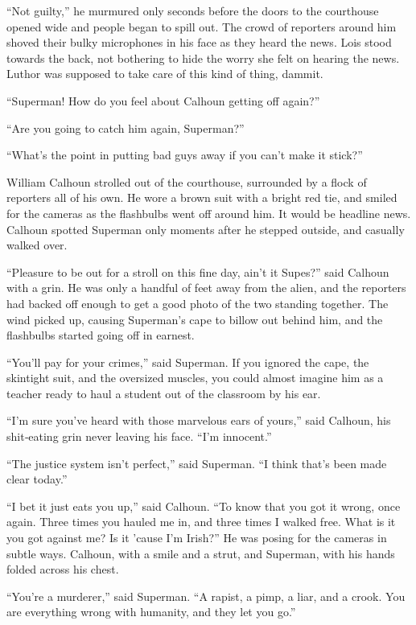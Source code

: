 \documentclass[ebook,12pt]{memoir}
\begin{document}
``Not guilty,'' he murmured only seconds before the doors to the
courthouse opened wide and people began to spill out. The crowd of
reporters around him shoved their bulky microphones in his face as they
heard the news. Lois stood towards the back, not bothering to hide the
worry she felt on hearing the news. Luthor was supposed to take care of
this kind of thing, dammit.

``Superman! How do you feel about Calhoun getting off again?''

``Are you going to catch him again, Superman?''

``What's the point in putting bad guys away if you can't make it
stick?''

William Calhoun strolled out of the courthouse, surrounded by a flock of
reporters all of his own. He wore a brown suit with a bright red tie,
and smiled for the cameras as the flashbulbs went off around him. It
would be headline news. Calhoun spotted Superman only moments after he
stepped outside, and casually walked over.

``Pleasure to be out for a stroll on this fine day, ain't it Supes?''
said Calhoun with a grin. He was only a handful of feet away from the
alien, and the reporters had backed off enough to get a good photo of
the two standing together. The wind picked up, causing Superman's cape
to billow out behind him, and the flashbulbs started going off in
earnest.

``You'll pay for your crimes,'' said Superman. If you ignored the cape,
the skintight suit, and the oversized muscles, you could almost imagine
him as a teacher ready to haul a student out of the classroom by his
ear.

``I'm sure you've heard with those marvelous ears of yours,'' said
Calhoun, his shit‐eating grin never leaving his face. ``I'm innocent.''

``The justice system isn't perfect,'' said Superman. ``I think that's
been made clear today.''

``I bet it just eats you up,'' said Calhoun. ``To know that you got it
wrong, once again. Three times you hauled me in, and three times I
walked free. What is it you got against me? Is it 'cause I'm Irish?'' He
was posing for the cameras in subtle ways. Calhoun, with a smile and a
strut, and Superman, with his hands folded across his chest.

``You're a murderer,'' said Superman. ``A rapist, a pimp, a liar, and a
crook. You are everything wrong with humanity, and they let you go.''
\end{document}
